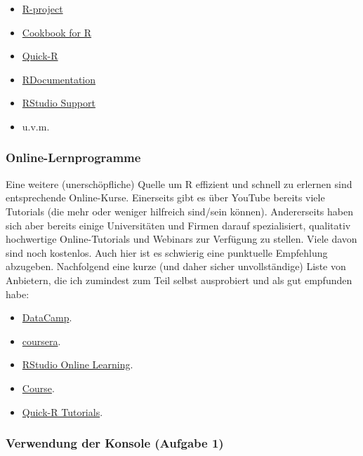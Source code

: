 \documentclass[]{article}
\providecommand{\tightlist}{%
  \setlength{\itemsep}{0pt}\setlength{\parskip}{0pt}}
\begin{document}
\begin{itemize}
\tightlist
\item
  \href{https://www.r-project.org/help.html}{R-project}
\item
  \href{http://www.cookbook-r.com/}{Cookbook for R}
\item
  \href{https://www.statmethods.net/interface/help.html}{Quick-R}
\item
  \href{https://www.rdocumentation.org/packages/utils/versions/3.5.1/topics/help}{RDocumentation}
\item
  \href{https://support.rstudio.com/hc/en-us}{RStudio Support}
\item
  u.v.m.
\end{itemize}

\subsubsection*{Online-Lernprogramme}\label{online-lernprogramme}

Eine weitere (unerschöpfliche) Quelle um R effizient und schnell zu
erlernen sind entsprechende Online-Kurse. Einerseits gibt es über
YouTube bereits viele Tutorials (die mehr oder weniger hilfreich
sind/sein können). Andererseits haben sich aber bereits einige
Universitäten und Firmen darauf spezialisiert, qualitativ hochwertige
Online-Tutorials und Webinars zur Verfügung zu stellen. Viele davon sind
noch kostenlos. Auch hier ist es schwierig eine punktuelle Empfehlung
abzugeben. Nachfolgend eine kurze (und daher sicher unvollständige)
Liste von Anbietern, die ich zumindest zum Teil selbst ausprobiert und
als gut empfunden habe:

\begin{itemize}
\tightlist
\item
  \href{https://www.datacamp.com/}{DataCamp}.
\item
  \href{https://www.coursera.org/}{coursera}.
\item
  \href{https://www.rstudio.com/online-learning/}{RStudio Online
  Learning}.
\item
  \href{https://www.udemy.com/r-programming/}{Course}.
\item
  \href{https://www.statmethods.net/r-tutorial/index.html}{Quick-R
  Tutorials}.
\end{itemize}

\subsubsection*{Verwendung der Konsole (Aufgabe
1)}\label{verwendung-der-konsole-aufgabe-1}
\end{document}
